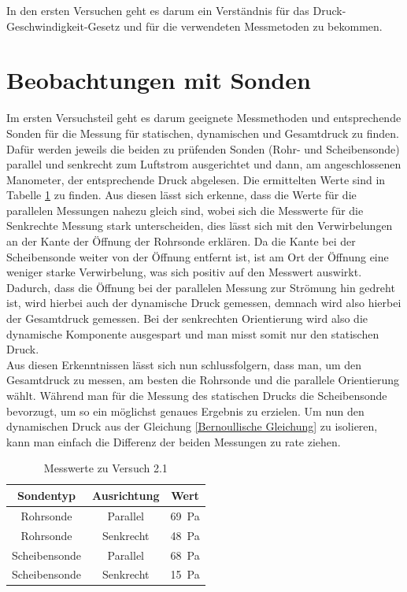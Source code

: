 In den ersten Versuchen geht es darum ein Verständnis für das Druck-Geschwindigkeit-Gesetz und für die verwendeten Messmetoden zu bekommen.

\section{Beobachtungen mit Sonden}

Im ersten Versuchsteil geht es darum geeignete Messmethoden und entsprechende Sonden für die Messung für statischen, dynamischen und Gesamtdruck zu finden. Dafür werden jeweils die beiden zu prüfenden Sonden (Rohr- und Scheibensonde) parallel und senkrecht zum Luftstrom ausgerichtet und dann, am angeschlossenen Manometer, der entsprechende Druck abgelesen. Die ermittelten Werte sind in Tabelle \ref{tab:TabelleD1} zu finden. Aus diesen lässt sich erkenne, dass die Werte für die parallelen Messungen nahezu gleich sind, wobei sich die Messwerte für die Senkrechte Messung stark unterscheiden, dies lässt sich mit den Verwirbelungen an der Kante der Öffnung der Rohrsonde erklären. Da die Kante bei der Scheibensonde weiter von der Öffnung entfernt ist, ist am Ort der Öffnung eine weniger starke Verwirbelung, was sich positiv auf den Messwert auswirkt. Dadurch, dass die Öffnung bei der parallelen Messung zur Strömung hin gedreht ist, wird hierbei auch der dynamische Druck gemessen, demnach wird also hierbei der Gesamtdruck gemessen. Bei der senkrechten Orientierung wird also die dynamische Komponente ausgespart und man misst somit nur den statischen Druck. \\
Aus diesen Erkenntnissen lässt sich nun schlussfolgern, dass man, um den Gesamtdruck zu messen, am besten die Rohrsonde und die parallele Orientierung wählt. Während man für die Messung des statischen Drucks die Scheibensonde bevorzugt, um so ein möglichst genaues Ergebnis zu erzielen. Um nun den dynamischen Druck aus der Gleichung \ref{Bernoullische Gleichung} zu isolieren, kann man einfach die Differenz der beiden Messungen zu rate ziehen.

\begin{table}[h!]
    \centering
    \caption{Messwerte zu Versuch 2.1}
    \begin{tabular}{c c c}
    	\hline
    	Sondentyp & Ausrichtung & Wert \\
    	\hline
    	Rohrsonde & Parallel &  \SI{69}{\pascal}\\
    	Rohrsonde  & Senkrecht & \SI{48}{\pascal}\\
    	Scheibensonde & Parallel & \SI{68}{\pascal}\\
    	Scheibensonde & Senkrecht &  \SI{15}{\pascal}\\
    	\hline
    \end{tabular}
    \label{tab:TabelleD1}
\end{table}

